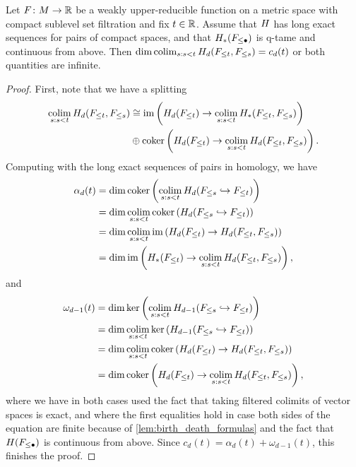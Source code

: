 \begin{prop}\label{prop:cap_limits}
	Let $F \colon M \to \mathbb{R}$ be a weakly upper-reducible function on a metric space with compact sublevel set filtration and fix $t \in \mathbb{R}$.
	Assume that $H$ has long exact sequences for pairs of compact spaces, and that $H_*(F_{\leq \bullet})$ is q-tame and continuous from above.
	Then $\dim \operatorname*{colim}_{s: s < t} H_d(F_{\leq t}, F_{\leq s}) = c_d(t)$ or both quantities are infinite.
\end{prop}
\begin{proof}
	First, note that we have a splitting
	\begin{align*}
	\operatorname*{colim}_{s: s < t} H_d(F_{\leq t}, F_{\leq s})
	&\cong \operatorname{im} \left( H_d(F_{\leq t}) \to \operatorname*{colim}_{s: s < t} H_*(F_{\leq t}, F_{\leq s}) \right) \\
	&\oplus \operatorname{coker} \left( H_d(F_{\leq t}) \to \operatorname*{colim}_{s: s < t} H_d(F_{\leq t}, F_{\leq s}) \right).
	\end{align*}
	Computing with the long exact sequences of pairs in homology, we have
	\begin{align*}
		\alpha_d(t)
		&= \dim \operatorname{coker} \left( \operatorname*{colim}_{s: s < t} H_d(F_{\leq s} \hookrightarrow F_{\leq t}) \right) \\
		&= \dim \operatorname*{colim}_{s: s < t} \operatorname{coker} \left( H_d(F_{\leq s} \hookrightarrow F_{\leq t}) \right) \\
		&= \dim \operatorname*{colim}_{s: s < t} \operatorname{im} \left( H_d(F_{\leq t}) \to H_d(F_{\leq t}, F_{\leq s}) \right) \\
		&= \dim \operatorname{im} \left( H_*(F_{\leq t}) \to \operatorname*{colim}_{s: s < t} H_d(F_{\leq t}, F_{\leq s}) \right), \\
	\end{align*}
	and
	\begin{align*}
		\omega_{d-1}(t)
		&= \dim \ker \left( \operatorname*{colim}_{s: s < t} H_{d-1}(F_{\leq s} \hookrightarrow F_{\leq t}) \right) \\
		&= \dim \operatorname*{colim}_{s: s < t} \ker \left( H_{d-1}(F_{\leq s} \hookrightarrow F_{\leq t}) \right) \\
		&= \dim \operatorname*{colim}_{s: s < t} \operatorname{coker} \left( H_d(F_{\leq t}) \to H_d(F_{\leq t}, F_{\leq s}) \right) \\
		&= \dim \operatorname{coker} \left( H_d(F_{\leq t}) \to \operatorname*{colim}_{s: s < t} H_d(F_{\leq t}, F_{\leq s}) \right), \\
	\end{align*}
	where we have in both cases used the fact that taking filtered colimits of vector spaces is exact, and where the first equalities hold in case both sides of the equation are finite because of \cref{lem:birth_death_formulas} and the fact that $H(F_{\leq \bullet})$ is continuous from above.
	Since $c_d(t) = \alpha_d(t) + \omega_{d-1}(t)$, this finishes the proof.
\end{proof}

